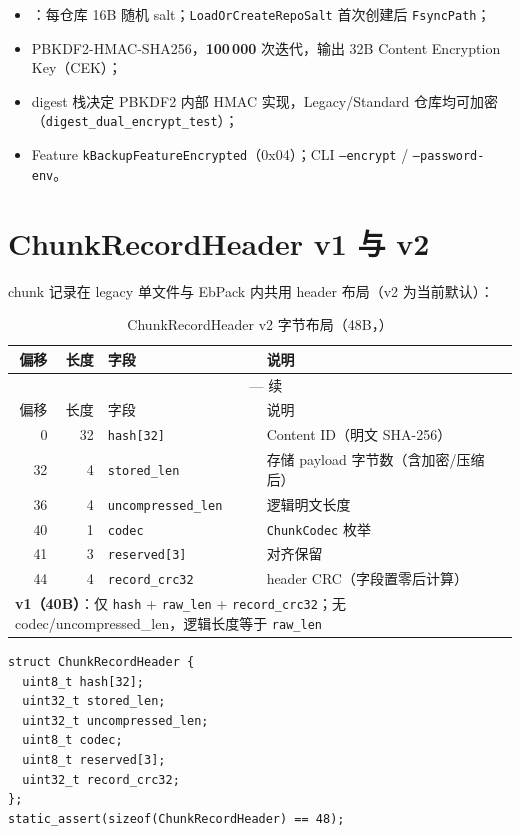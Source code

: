 \begin{itemize}
  \item {}：每仓库 16B 随机 salt；\texttt{LoadOrCreateRepoSalt} 首次创建后 \texttt{FsyncPath}；
  \item PBKDF2-HMAC-SHA256，\textbf{100\,000} 次迭代，输出 32B Content Encryption Key（CEK）；
  \item digest 栈决定 PBKDF2 内部 HMAC 实现，Legacy/Standard 仓库均可加密（\texttt{digest\_dual\_encrypt\_test}）；
  \item Feature \texttt{kBackupFeatureEncrypted}（0x04）；CLI \texttt{--encrypt} / \texttt{--password-env}。
\end{itemize}

\section{ChunkRecordHeader v1 与 v2}

chunk 记录在 legacy 单文件与 EbPack 内共用 header 布局（v2 为当前默认）：

\begin{longtable}{@{}rrl p{6cm}@{}}
\caption{ChunkRecordHeader v2 字节布局（48B，）} \\
\toprule
偏移 & 长度 & 字段 & 说明 \\
\midrule
\endfirsthead
\multicolumn{4}{c}{\tablename\ \thetable{} — 续} \\
\toprule
偏移 & 长度 & 字段 & 说明 \\
\midrule
\endhead
0 & 32 & \texttt{hash[32]} & Content ID（明文 SHA-256） \\
32 & 4 & \texttt{stored\_len} & 存储 payload 字节数（含加密/压缩后） \\
36 & 4 & \texttt{uncompressed\_len} & 逻辑明文长度 \\
40 & 1 & \texttt{codec} & \texttt{ChunkCodec} 枚举 \\
41 & 3 & \texttt{reserved[3]} & 对齐保留 \\
44 & 4 & \texttt{record\_crc32} & header CRC（字段置零后计算） \\
\midrule
\multicolumn{4}{l}{\textbf{v1（40B）}：仅 \texttt{hash} + \texttt{raw\_len} + \texttt{record\_crc32}；无 codec/uncompressed\_len，逻辑长度等于 \texttt{raw\_len}} \\
\bottomrule
\end{longtable}

\begin{lstlisting}[caption={ChunkRecordHeader v2 结构},label={lst:chunk-header-v2}]
struct ChunkRecordHeader {
  uint8_t hash[32];
  uint32_t stored_len;
  uint32_t uncompressed_len;
  uint8_t codec;
  uint8_t reserved[3];
  uint32_t record_crc32;
};
static_assert(sizeof(ChunkRecordHeader) == 48);
\end{lstlisting}

